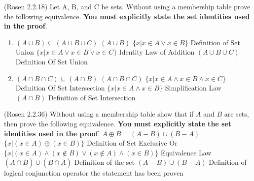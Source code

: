 \documentclass[10pt]{exam}
\begin{document}
\begin{questions}
\question[4] (Rosen 2.2.18) Let A, B, and C be sets. Without using a membership table prove the following equivalence. \textbf{You must explicitly state the set identities used in the proof}.
\begin{enumerate} [label=(\alph*)]
 \item $(A \cup B) \subseteq (A \cup B \cup C)$
 \newline $(A \cup B)$
 \newline $\{x|x\in A \lor x\in B\}$ Definition of Set Union
 \newline $\{x|x\in A \lor x\in B \lor x\in C\}$ Identity Law of Addition
 \newline $(A \cup B \cup C)$ Definition Of Set Union
 \item $(A \cap B \cap C) \subseteq (A \cap B)$
 \newline $(A \cap B \cap C)$
 \newline $\{x| x\in A \land x\in B \land x\in C\}$ Definition Of Set Intersection
 \newline $\{x| x\in A \land x\in B\}$ Simplification Law
 \newline $(A \cap B)$ Definition of Set Intersection
 
 \newline 
 \end{enumerate}


\question[3] (Rosen 2.2.36) Without using a membership table show that if $A$ and $B$ are sets, then prove the following equivalence. \textbf{You must explicitly state the set identities used in the proof}.
\newline $A \oplus  B = (A - B) \cup (B - A)$
\newline $\{x| (x\in A) \oplus (x\in B)\}$ Definition of Set Exclusive Or
\newline $\{x| (x\in A) \land (x\notin B) \lor (x\notin A) \land (x\in B)\}$ Equivalence Law
\newline $(A \cap \overline{B}) \cup (B \cap \overline{A})$ Definition of the set
\newline $(A-B) \cup (B-A)$ Definition of logical conjunction operator
\newline the statement has been proven
\newline 


\end{questions}
\end{document}
